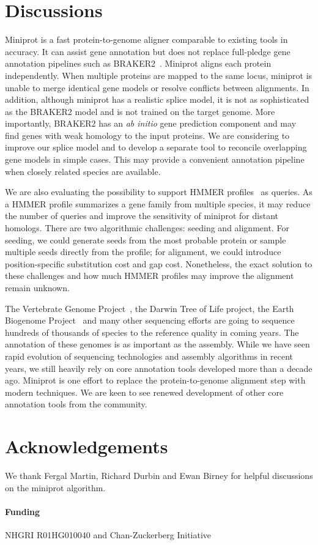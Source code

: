 \documentclass{bioinfo}
\begin{document}
\section{Discussions}

Miniprot is a fast protein-to-genome aligner comparable to existing tools in
accuracy. It can assist gene annotation but does not replace full-pledge gene
annotation pipelines such as BRAKER2~\citep{Bruna:2021ug}.  Miniprot aligns
each protein independently. When multiple proteins are mapped to the same
locus, miniprot is unable to merge identical gene models or resolve conflicts
between alignments. In addition, although miniprot has a realistic splice
model, it is not as sophisticated as the BRAKER2 model and is not trained on
the target genome. More importantly, BRAKER2 has an \emph{ab initio} gene
prediction component and may find genes with weak homology to the input
proteins. We are considering to improve our splice model and to develop a
separate tool to reconcile overlapping gene models in simple cases. This may
provide a convenient annotation pipeline when closely related species are
available.

We are also evaluating the possibility to support HMMER
profiles~\citep{Eddy:2011tg} as queries. As a HMMER profile summarizes a gene
family from multiple species, it may reduce the number of queries and improve
the sensitivity of miniprot for distant homologs. There are two algorithmic
challenges: seeding and alignment.  For seeding, we could generate seeds from
the most probable protein or sample multiple seeds directly from the profile;
for alignment, we could introduce position-specific substitution cost and gap
cost. Nonetheless, the exact solution to these challenges and how much HMMER
profiles may improve the alignment remain unknown.

The Vertebrate Genome Project~\citep{Rhie:2021ug}, the Darwin Tree of Life
project, the Earth Biogenome Project~\citep{Lewin:2018ve} and many other sequencing efforts are
going to sequence hundreds of thousands of species to the reference quality in
coming years. The annotation of these genomes is as important as the assembly.
While we have seen rapid evolution of sequencing technologies and assembly
algorithms in recent years, we still heavily rely on core annotation tools
developed more than a decade ago. Miniprot is one effort to replace the
protein-to-genome alignment step with modern techniques. We are keen to see
renewed development of other core annotation tools from the community.

\section*{Acknowledgements}

We thank Fergal Martin, Richard Durbin and Ewan Birney for helpful discussions
on the miniprot algorithm.

\paragraph{Funding\textcolon} NHGRI R01HG010040 and Chan-Zuckerberg Initiative


\end{document}
